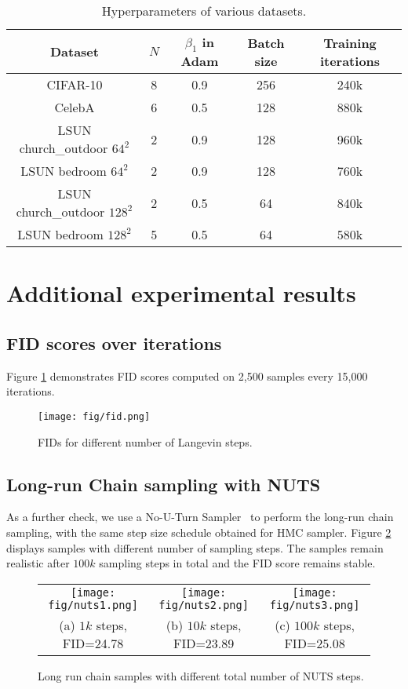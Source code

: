 \documentclass{article} \usepackage{iclr2021_conference,times}
\begin{document}
\begin{table}[ht]
    \centering
        \caption{Hyperparameters of various datasets.}
        \footnotesize
    \begin{tabular}{ccccc}
    \toprule
        Dataset & $N$ & $\beta_1$ in Adam & Batch size & Training iterations  \\
        \midrule
        CIFAR-10 & 8 & 0.9 & 256 & 240k \\
        CelebA & 6 & 0.5 & 128 & 880k \\
        LSUN church\_outdoor $64^2$ & 2 & 0.9 & 128 & 960k \\
        LSUN bedroom $64^2$ & 2 & 0.9 & 128 & 760k \\
        LSUN church\_outdoor $128^2$ & 2 & 0.5 & 64 & 840k \\
        LSUN bedroom $128^2$ & 5 & 0.5 & 64 & 580k \\
        \bottomrule
    \end{tabular}
    \label{tabl:hyper}
\end{table}
\section{Additional experimental results}
\subsection{FID scores over iterations} \label{app:fid}
Figure \ref{fig:fid} demonstrates FID scores computed on 2,500 samples every 15,000 iterations. 
 \begin{figure}[h]
 \centering
 \texttt{[image: fig/fid.png]} 
 \caption{FIDs for different number of Langevin steps.}
 \label{fig:fid}
 \end{figure}
\subsection{Long-run Chain sampling with NUTS} \label{app:long-run}
As a further check, we use a No-U-Turn Sampler~\citep{hoffman2014no} to perform the long-run chain sampling, with the same step size schedule obtained for HMC sampler. Figure \ref{fig: long-run2} displays samples with different number of sampling steps. The samples remain realistic after $100k$ sampling steps in total and the FID score remains stable. 
\begin{figure}[ht]
\begin{center}
\begin{tabular}{ccc}
	\texttt{[image: fig/nuts1.png]} &
\texttt{[image: fig/nuts2.png]} &
\texttt{[image: fig/nuts3.png]}\\
(a) $1k$ steps, FID=24.78 & (b) $10k$ steps, FID=23.89 & (c) $100k$ steps, FID=25.08
\end{tabular}
\end{center}
\caption{Long run chain samples with different total number of NUTS steps. }
\label{fig: long-run2}
\end{figure}
\end{document}
